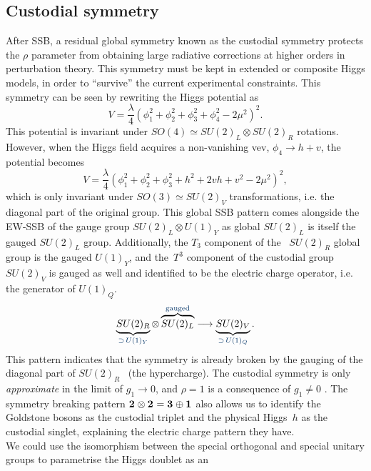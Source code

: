 \subsection{Custodial symmetry}
After SSB, a residual global symmetry known as the custodial symmetry protects the $\rho$ parameter from obtaining large radiative corrections at higher orders in perturbation theory.  This symmetry must be kept in extended or composite Higgs models, in order to ``survive'' the current experimental constraints. This symmetry can be seen by rewriting the Higgs potential as
\begin{equation}
	V = \frac{\lambda}{4} \left( \phi_1^2+\phi^2_2+\phi_3^2+\phi^2_4 -2 \mu^2\right)^2.
\end{equation}
This potential is invariant under $SO(4)\simeq SU(2)_L \otimes SU(2)_R$ rotations. However, when the Higgs field acquires a non-vanishing vev,  $ \phi_4 \to h+v$, the potential becomes
\begin{equation}
	V = \frac{\lambda}{4} \left( \phi_1^2+\phi^2_2+\phi_3^2+ h^2+2vh+v^2 -2 \mu^2\right)^2,
\end{equation}
which is only invariant under  $SO(3)\simeq SU(2)_V$ transformations, i.e. the diagonal part of the original group. This global SSB pattern comes alongside the EW-SSB of the gauge group $SU(2)_L \otimes U(1)_Y$ as global $SU(2)_L$ is itself the gauged $SU(2)_L$  group. Additionally, the $T_3$ component of the ~$SU(2)_R$ global group is the gauged $U(1)_Y$, and the~$T^3$ component of the custodial group~$SU(2)_V$ is gauged as well and identified to be the electric charge operator, i.e. the generator of $U(1)_Q$. 
\begin{equation}
	\underbrace{SU(2)_R}_{{\color{myblue} \supset\, U(1)_Y}} \otimes \overbrace{SU(2)_L}^{{\color{myblue} \text{gauged}}} \longrightarrow \underbrace{SU(2)_V}_{{\color{myblue} \supset\, U(1)_Q}} .
\end{equation}
This pattern indicates that the symmetry is already broken by the gauging of the diagonal part of $SU(2)_R$ ~(the hypercharge). The custodial symmetry is only \emph{approximate} in the limit of $ g_1 \to 0$, and $\rho=1$ is a consequence of $g_1\neq 0$ . The symmetry breaking pattern $\irrep{2} \otimes \irrep{2} = \irrep{3} \oplus \irrep{1}$ also allows us to identify the Goldstone bosons as the custodial triplet and the physical Higgs~$h$ as the custodial singlet, explaining the electric charge pattern they have.   \\
We could use the isomorphism between the special orthogonal and special unitary groups to parametrise the Higgs doublet as an 
